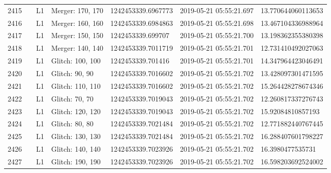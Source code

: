 \begin{longtable}{lllllll}
2415 &                                                    &       L1 &  Merger: 170, 170 &  1242453339.6967773 &  2019-05-21 05:55:21.697 &  13.770644060113653 \\
2416 &                                                    &       L1 &  Merger: 160, 160 &  1242453339.6984863 &  2019-05-21 05:55:21.698 &  13.467104336988964 \\
2417 &                                                    &       L1 &  Merger: 150, 150 &   1242453339.699707 &  2019-05-21 05:55:21.700 &  13.198362355380398 \\
2418 &                                                    &       L1 &  Merger: 140, 140 &  1242453339.7011719 &  2019-05-21 05:55:21.701 &  12.731410492027063 \\
2419 &                                                    &       L1 &  Glitch: 100, 100 &   1242453339.701416 &  2019-05-21 05:55:21.701 &  14.347964423046491 \\
2420 &                                                    &       L1 &    Glitch: 90, 90 &  1242453339.7016602 &  2019-05-21 05:55:21.702 &  13.428097301471595 \\
2421 &                                                    &       L1 &  Glitch: 110, 110 &  1242453339.7016602 &  2019-05-21 05:55:21.702 &  15.264428278674346 \\
2422 &                                                    &       L1 &    Glitch: 70, 70 &  1242453339.7019043 &  2019-05-21 05:55:21.702 &  12.260817337276743 \\
2423 &                                                    &       L1 &  Glitch: 120, 120 &  1242453339.7019043 &  2019-05-21 05:55:21.702 &   15.92084810857193 \\
2424 &                                                    &       L1 &    Glitch: 80, 80 &  1242453339.7021484 &  2019-05-21 05:55:21.702 &  12.771882440767445 \\
2425 &                                                    &       L1 &  Glitch: 130, 130 &  1242453339.7021484 &  2019-05-21 05:55:21.702 &  16.288407601798227 \\
2426 &                                                    &       L1 &  Glitch: 140, 140 &  1242453339.7023926 &  2019-05-21 05:55:21.702 &    16.3980477535731 \\
2427 &                                                    &       L1 &  Glitch: 190, 190 &  1242453339.7023926 &  2019-05-21 05:55:21.702 &  16.598203692524002 \\

\end{longtable}
